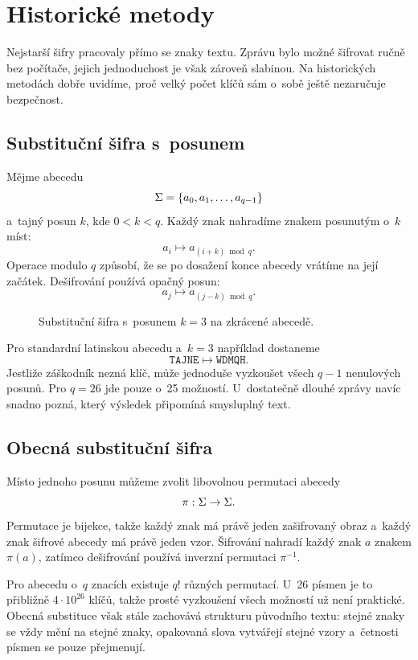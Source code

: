 \section{Historické metody}\label{sec:krypto-historicke}

Nejstarší šifry pracovaly přímo se znaky textu. Zprávu bylo možné šifrovat ručně bez počítače, jejich jednoduchost je však zároveň slabinou. Na historických metodách dobře uvidíme, proč velký počet klíčů sám o~sobě ještě nezaručuje bezpečnost.

\subsection{Substituční šifra s~posunem}

Mějme abecedu
\[
    \Sigma=\left\{a_0,a_1,\ldots,a_{q-1}\right\}
\]
a~tajný posun $k$, kde $0<k<q$. Každý znak nahradíme znakem posunutým o~$k$ míst:
\[
    a_i\longmapsto a_{(i+k)\bmod q}.
\]
Operace modulo $q$ způsobí, že se po dosažení konce abecedy vrátíme na její začátek. Dešifrování používá opačný posun:
\[
    a_j\longmapsto a_{(j-k)\bmod q}.
\]

\begin{figure}[ht]
    \centering
    
    \caption{Substituční šifra s~posunem $k=3$ na zkrácené abecedě.}
    \label{fig:krypto-caesar}
\end{figure}

Pro standardní latinskou abecedu a~$k=3$ například dostaneme
\[
    \texttt{TAJNE}\longmapsto\texttt{WDMQH}.
\]
Jestliže záškodník nezná klíč, může jednoduše vyzkoušet všech $q-1$ nenulových posunů. Pro $q=26$ jde pouze o~25 možností. U~dostatečně dlouhé zprávy navíc snadno pozná, který výsledek připomíná smysluplný text.

\subsection{Obecná substituční šifra}

Místo jednoho posunu můžeme zvolit libovolnou permutaci abecedy
\[
    \pi:\Sigma \rightarrow \Sigma.
\]
Permutace je bijekce, takže každý znak má právě jeden zašifrovaný obraz a~každý znak šifrové abecedy má právě jeden vzor. Šifrování nahradí každý znak $a$ znakem $\pi(a)$, zatímco dešifrování používá inverzní permutaci $\pi^{-1}$.

Pro abecedu o~$q$ znacích existuje $q!$ různých permutací. U~26 písmen je to přibližně $4\cdot 10^{26}$ klíčů, takže prosté vyzkoušení všech možností už není praktické. Obecná substituce však stále zachovává strukturu původního textu: stejné znaky se vždy mění na stejné znaky, opakovaná slova vytvářejí stejné vzory a~četnosti písmen se pouze přejmenují.

